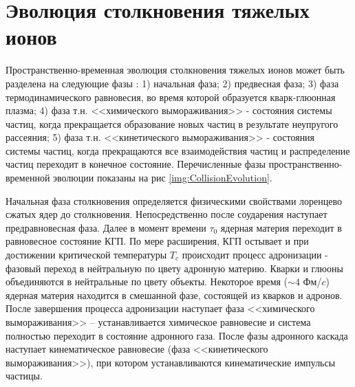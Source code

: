 \begin{comment}
	Переход из КГП в состояние адронного газа называют адронизацией кварк глюонной плазмы. Основными моделями адронизации КГП являются модель рекомбинации и модель фрагментации струн.
	
	\begin{figure}[] 
		\center
		\includegraphics [width = 0,7\linewidth] {Intro/PhaseDiagram.png}
		\caption{Теоретическая фазовая диаграмма ядерной материи для двух безмассовых кварков в зависимости от температуры T и барионного химического потенциала}
		\label{img:PhaseDiagram}  
	\end{figure}
	
	
	Температура перехода соответствует плотности энергии $\epsilon = 1$ ГэВ/фм$^3$, что почти на порядок превышает плотность ядерного вещества $\epsilon_0 = 0,15$ ГэВ/фм$^3$[1407,5003]. Температуры и давления, необходимые для образования кварк-глюонной материи, достигаются в столкновениях тяжелых релятивистских ионоов.
	
	Исследованию КГП в релятивистских столкновениях посвящены такие эксперименты, как PHENIX и STAR (BNL), ALICE(CERN), CBM(JSI), MPD(NICA) и другие.
\end{comment}

\section{Эволюция столкновения тяжелых ионов}

Пространственно-временная эволюция столкновения тяжелых ионов может быть разделена на следующие фазы \cite{QGP_signatures}: 1) начальная фаза; 2) предвесная фаза; 3) фаза термодинамического равновесия, во время которой образуется кварк-глюонная плазма; 4) фаза т.н. <<химического вымораживания>> - состояния системы частиц, когда прекращается образование новых частиц в результате неупругого рассеяния; 5) фаза т.н. <<кинетического вымораживания>> - состояния системы частиц, когда прекращаются все взаимодействия частиц и распределение частиц переходит в конечное состояние.  
Перечисленные фазы пространственно-временной эволюции показаны на рис  \ref{img:CollisionEvolution}.

Начальная фаза столкновения определяется физическими свойствами лоренцево сжатых ядер до столкновения. Непосредственно после соударения наступает предравновесная фаза. Далее в момент времени $\tau_0$ ядерная материя переходит в равновесное состояние КГП. По мере расширения, КГП остывает и при достижении критической температуры $T_c$ происходит процесс адронизации - фазовый переход в нейтральную по цвету адронную материю. Кварки и глюоны объединяются в нейтральные по цвету объекты. Некоторое время ($\sim 4$ Фм/$c$) ядерная материя находится в смешанной фазе, состоящей из кварков и адронов. После завершения процесса адронизации наступает фаза <<химического вымораживания>> -- устанавливается химическое равновесие и система полностью переходит в состояние адронного газа. После фазы адронного каскада наступает кинематическое равновесие (фаза <<кинетического вымораживания>>), при котором устанавливаются кинематические импульсы частицы.

